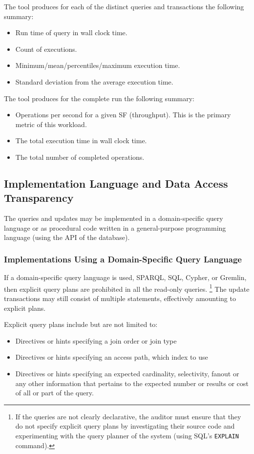 The tool produces for each of the distinct queries and transactions the following summary:
\begin{itemize}
    \item Run time of query in wall clock time.
    \item Count of executions.
    \item Minimum/mean/percentiles/maximum execution time.
    \item Standard deviation from the average execution time.
\end{itemize}
The tool produces for the complete run the following summary:
\begin{itemize}
    \item Operations per second for a given SF (throughput). This is the primary metric of this workload.
    \item The total execution time in wall clock time.
    \item The total number of completed operations.
\end{itemize}


\subsection{Implementation Language and Data Access Transparency}

The queries and updates may be implemented in a domain-specific query language or as procedural code written in a general-purpose programming language (\eg using the API of the database).

\subsubsection{Implementations Using a Domain-Specific Query Language}
\label{sec:snb-domain-specific-query-language}

If a domain-specific query language is used, \eg SPARQL, SQL, Cypher, or Gremlin, then explicit query plans are prohibited in all the read-only queries.%
\footnote{If the queries are not clearly declarative, the auditor must ensure that they do not specify explicit query plans by investigating their source code and experimenting with the query planner of the system (\eg using SQL's \texttt{EXPLAIN} command).}
The update transactions may still consist of multiple statements, effectively amounting to explicit plans.

Explicit query plans include but are not limited to:
\begin{itemize}
    \item Directives or hints specifying a join order or join type
    \item Directives or hints specifying an access path, \eg which index to use
    \item Directives or hints specifying an expected cardinality, selectivity, fanout or any other information that pertains to the expected number or results or cost of all or part of the query.
\end{itemize}


